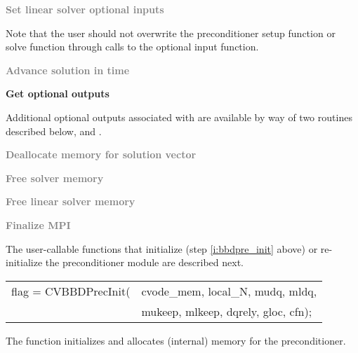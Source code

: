 \begin{Steps}
\item
  \textcolor{gray}{\bf Set linear solver optional inputs}

  Note that the user should not overwrite the preconditioner setup function
  or solve function through calls to the 
  optional input function.

\item
  \textcolor{gray}{\bf Advance solution in time}

\item
  {\bf Get optional outputs}

  Additional optional outputs associated with {\cvbbdpre} are available by 
  way of two routines described below,
   and .

\item
  \textcolor{gray}{\bf Deallocate memory for solution vector}

\item
  \textcolor{gray}{\bf Free solver memory}

\item
  \textcolor{gray}{\bf Free linear solver memory}
  
\item 
  \textcolor{gray}{\bf Finalize MPI}

\end{Steps}
The user-callable functions that initialize (step \ref{i:bbdpre_init} above) or re-initialize
the {\cvbbdpre} preconditioner module are described next.
{
   \begin{tabular}[t]{@{}r@{}l@{}}
     flag = CVBBDPrecInit(&cvode\_mem, local\_N, mudq, mldq, \\
                          &mukeep, mlkeep, dqrely, gloc, cfn);
   \end{tabular}
}
{
  The function  initializes and allocates (internal)
  memory for the {\cvbbdpre} preconditioner.
}
